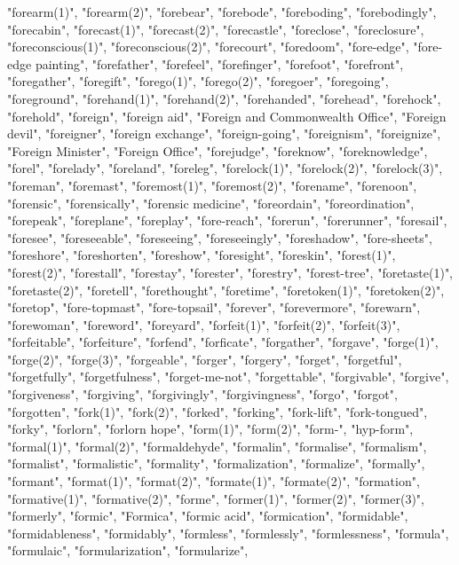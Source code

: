 "forearm(1)",
"forearm(2)",
"forebear",
"forebode",
"foreboding",
"forebodingly",
"forecabin",
"forecast(1)",
"forecast(2)",
"forecastle",
"foreclose",
"foreclosure",
"foreconscious(1)",
"foreconscious(2)",
"forecourt",
"foredoom",
"fore-edge",
"fore-edge painting",
"forefather",
"forefeel",
"forefinger",
"forefoot",
"forefront",
"foregather",
"foregift",
"forego(1)",
"forego(2)",
"foregoer",
"foregoing",
"foreground",
"forehand(1)",
"forehand(2)",
"forehanded",
"forehead",
"forehock",
"forehold",
"foreign",
"foreign aid",
"Foreign and Commonwealth Office",
"Foreign devil",
"foreigner",
"foreign exchange",
"foreign-going",
"foreignism",
"foreignize",
"Foreign Minister",
"Foreign Office",
"forejudge",
"foreknow",
"foreknowledge",
"forel",
"forelady",
"foreland",
"foreleg",
"forelock(1)",
"forelock(2)",
"forelock(3)",
"foreman",
"foremast",
"foremost(1)",
"foremost(2)",
"forename",
"forenoon",
"forensic",
"forensically",
"forensic medicine",
"foreordain",
"foreordination",
"forepeak",
"foreplane",
"foreplay",
"fore-reach",
"forerun",
"forerunner",
"foresail",
"foresee",
"foreseeable",
"foreseeing",
"foreseeingly",
"foreshadow",
"fore-sheets",
"foreshore",
"foreshorten",
"foreshow",
"foresight",
"foreskin",
"forest(1)",
"forest(2)",
"forestall",
"forestay",
"forester",
"forestry",
"forest-tree",
"foretaste(1)",
"foretaste(2)",
"foretell",
"forethought",
"foretime",
"foretoken(1)",
"foretoken(2)",
"foretop",
"fore-topmast",
"fore-topsail",
"forever",
"forevermore",
"forewarn",
"forewoman",
"foreword",
"foreyard",
"forfeit(1)",
"forfeit(2)",
"forfeit(3)",
"forfeitable",
"forfeiture",
"forfend",
"forficate",
"forgather",
"forgave",
"forge(1)",
"forge(2)",
"forge(3)",
"forgeable",
"forger",
"forgery",
"forget",
"forgetful",
"forgetfully",
"forgetfulness",
"forget-me-not",
"forgettable",
"forgivable",
"forgive",
"forgiveness",
"forgiving",
"forgivingly",
"forgivingness",
"forgo",
"forgot",
"forgotten",
"fork(1)",
"fork(2)",
"forked",
"forking",
"fork-lift",
"fork-tongued",
"forky",
"forlorn",
"forlorn hope",
"form(1)",
"form(2)",
"form-",
"hyp-form",
"formal(1)",
"formal(2)",
"formaldehyde",
"formalin",
"formalise",
"formalism",
"formalist",
"formalistic",
"formality",
"formalization",
"formalize",
"formally",
"formant",
"format(1)",
"format(2)",
"formate(1)",
"formate(2)",
"formation",
"formative(1)",
"formative(2)",
"forme",
"former(1)",
"former(2)",
"former(3)",
"formerly",
"formic",
"Formica",
"formic acid",
"formication",
"formidable",
"formidableness",
"formidably",
"formless",
"formlessly",
"formlessness",
"formula",
"formulaic",
"formularization",
"formularize",
